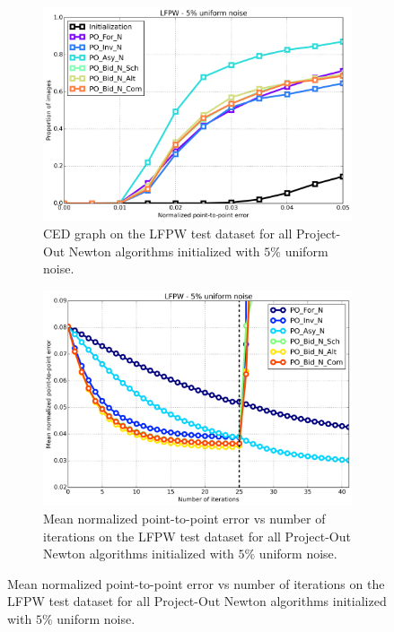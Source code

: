 \begin{figure}[p]
	\centering
	\begin{subfigure}{0.48\textwidth}
	    \includegraphics[width=\textwidth]{experiments/algorithms/po_n/ced_po_n_5.png}
	    \caption{CED graph on the LFPW test dataset for all Project-Out Newton algorithms initialized with $5\%$ uniform noise.}
	    \label{fig:ced_po_n_5}
	\end{subfigure}
	\hfill
	\begin{subfigure}{0.48\textwidth}
	    \includegraphics[width=\textwidth]{experiments/algorithms/po_n/mean_error_vs_iters_po_n_5.png}
	    \caption{Mean normalized point-to-point error vs number of iterations on the LFPW test dataset for all Project-Out Newton algorithms initialized with $5\%$ uniform noise.}
	    \label{fig:mean_error_vs_iters_po_n_5}
	\end{subfigure}

\end{figure}
